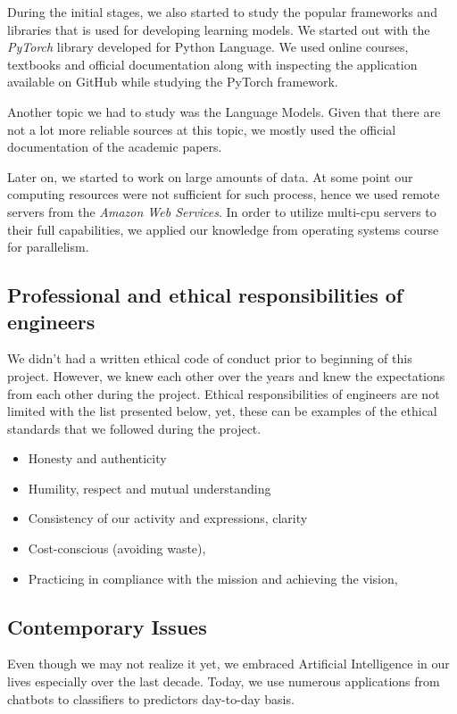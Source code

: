 \documentclass{mefsdp}
\begin{document}
	During the initial stages, we also started to study the popular frameworks and libraries that is used for developing learning models. We started out with the \textit{PyTorch} library developed for Python Language. We used online courses, textbooks and official documentation along with inspecting the application available on GitHub while studying the PyTorch framework.
	
	Another topic we had to study was the Language Models. Given that there are not a lot more reliable sources at this topic, we mostly used the official documentation of the academic papers.
	
	Later on, we started to work on large amounts of data. At some point our computing resources were not sufficient for such process, hence we used remote servers from the \textit{Amazon Web Services}. In order to utilize multi-cpu servers to their full capabilities, we applied our knowledge from operating systems course for parallelism. 
	
	\subsection{Professional and ethical responsibilities of engineers}
	
	We didn't had a written ethical code of conduct prior to beginning of this project. However, we knew each other over the years and knew the expectations from each other during the project.
	Ethical responsibilities of engineers are not limited with the list presented below, yet, these can be examples of the ethical standards that we followed during the project.
	
	\begin{itemize}
		\item	Honesty and authenticity
		\item	Humility, respect and mutual understanding
		\item	Consistency of our activity and expressions, clarity
		\item	Cost-conscious (avoiding waste),
		\item	Practicing in compliance with the mission and achieving the vision,
	\end{itemize}

	
	\subsection{Contemporary Issues}
	
	Even though we may not realize it yet, we embraced Artificial Intelligence in our lives especially over the last decade. Today, we use numerous applications from chatbots to classifiers to predictors day-to-day basis. \newline \par
	
\end{document}
